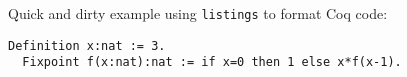 Quick and dirty example using \verb+listings+ to format Coq code:

\begin{lstlisting}[language=coq]
  Definition x:nat := 3.
  Fixpoint f(x:nat):nat := if x=0 then 1 else x*f(x-1).
\end{lstlisting}